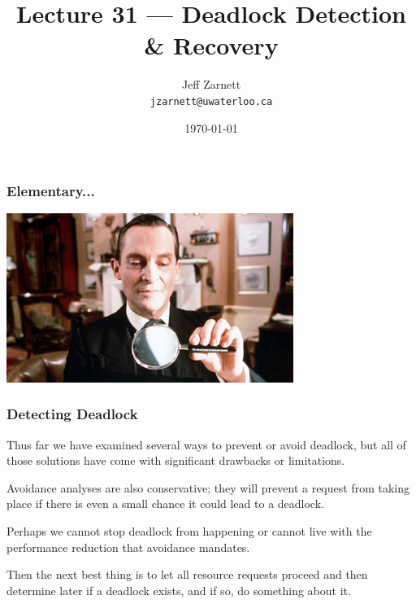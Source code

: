 

\title{Lecture 31 --- Deadlock Detection \& Recovery }

\author{Jeff Zarnett \\ \small \texttt{jzarnett@uwaterloo.ca}}
\date{\today}




\begin{frame}
	\titlepage

\end{frame}


\begin{frame}
	\frametitle{Elementary...}

	\begin{center}
		\includegraphics[width=0.7\textwidth]{images/jeremy-brett.jpg}
	\end{center}

\end{frame}


\begin{frame}
	\frametitle{Detecting Deadlock}

	Thus far we have examined several ways to prevent or avoid deadlock, but all of those solutions have come with significant drawbacks or limitations.

	Avoidance analyses are also conservative; they will prevent a request from taking place if there is even a small chance it could lead to a deadlock.

	Perhaps we cannot stop deadlock from happening or cannot live with the performance reduction that avoidance mandates.

	Then the next best thing is to let all resource requests proceed and then determine later if a deadlock exists, and if so, do something about it.

\end{frame}


